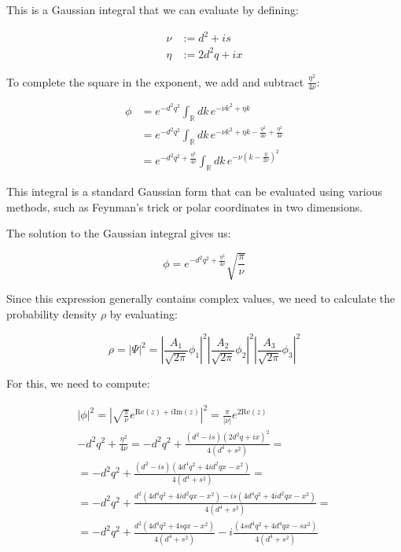 \documentclass[italian]{HKNdocument}
\begin{document}
This is a Gaussian integral that we can evaluate by defining:

\begin{align}
\nu &:= d^2+is \\
\eta &:= 2d^2q+ix \label{eq:3.15}
\end{align}

To complete the square in the exponent, we add and subtract $\frac{\eta^2}{4\nu}$:

\begin{align}
\phi &= e^{-d^2q^2}\int_{\mathbb{R}}dk\,e^{-\nu k^2+\eta k} \\
&= e^{-d^2q^2}\int_{\mathbb{R}}dk\,e^{-\nu k^2+\eta k-\frac{\eta^2}{4\nu}+\frac{\eta^2}{4\nu}} \label{eq:3.16} \\
&= e^{-d^2q^2+\frac{\eta^2}{4\nu}}\int_{\mathbb{R}}dk\,e^{-\nu\left(k-\frac{\eta}{2\nu}\right)^2}
\end{align}

This integral is a standard Gaussian form that can be evaluated using various methods, such as Feynman's trick or polar coordinates in two dimensions.


The solution to the Gaussian integral gives us:

\begin{equation}
\phi = e^{-d^2q^2+\frac{\eta^2}{4\nu}}\sqrt{\frac{\pi}{\nu}} \label{eq:3.17}
\end{equation}

Since this expression generally contains complex values, we need to calculate the probability density $\rho$ by evaluating:

\begin{equation}
\rho = |\Psi|^2 = \left|\frac{A_1}{\sqrt{2\pi}}\phi_1\right|^2\left|\frac{A_2}{\sqrt{2\pi}}\phi_2\right|^2\left|\frac{A_3}{\sqrt{2\pi}}\phi_3\right|^2 \label{eq:3.18}
\end{equation}

For this, we need to compute:

\begin{gather}
|\phi|^2 = \left|\sqrt{\frac{\pi}{\nu}}e^{\text{Re}(z)+i\text{Im}(z)}\right|^2 = \frac{\pi}{|\nu|}e^{2\text{Re}(z)} \label{eq:3.19} \\
-d^2q^2+\frac{\eta^2}{4\nu} = -d^2q^2+\frac{(d^2-is)(2d^2q+ix)^2}{4(d^4+s^2)} = \\
= -d^2q^2+\frac{(d^2-is)(4d^4q^2+4id^2qx-x^2)}{4(d^4+s^2)} = \\
= -d^2q^2+\frac{d^2(4d^4q^2+4id^2qx-x^2)-is(4d^4q^2+4id^2qx-x^2)}{4(d^4+s^2)} = \label{eq:3.20} \\
= -d^2q^2+\frac{d^2(4d^4q^2+4sqx-x^2)}{4(d^4+s^2)}-i\frac{(4sd^4q^2+4d^4qx-sx^2)}{4(d^4+s^2)}
\end{gather}
\end{document}
